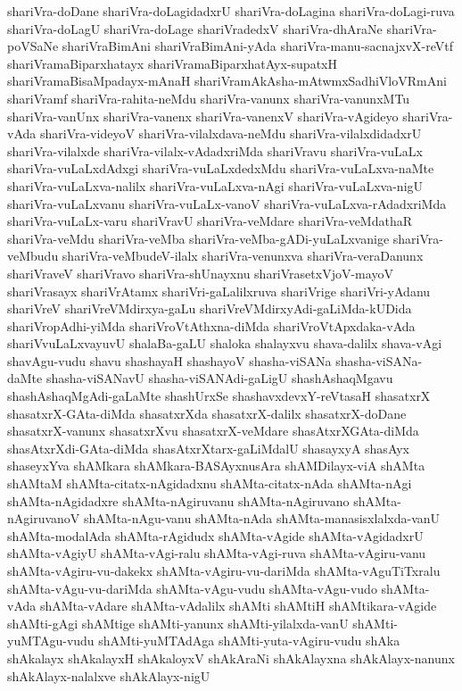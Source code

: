 {shariVra-doDane
shariVra-doLagidadxrU
shariVra-doLagina
shariVra-doLagi-ruva
shariVra-doLagU
shariVra-doLage
shariVradedxV
shariVra-dhAraNe
shariVra-poVSaNe
shariVraBimAni
shariVraBimAni-yAda
shariVra-manu-sacnajxvX-reVtf
shariVramaBiparxhatayx
shariVramaBiparxhatAyx-supatxH
shariVramaBisaMpadayx-mAnaH
shariVramAkAsha-mAtwmxSadhiVloVRmAni
shariVramf
shariVra-rahita-neMdu
shariVra-vanunx
shariVra-vanunxMTu
shariVra-vanUnx
shariVra-vanenx
shariVra-vanenxV
shariVra-vAgideyo
shariVra-vAda
shariVra-videyoV
shariVra-vilalxdava-neMdu
shariVra-vilalxdidadxrU
shariVra-vilalxde
shariVra-vilalx-vAdadxriMda
shariVravu
shariVra-vuLaLx
shariVra-vuLaLxdAdxgi
shariVra-vuLaLxdedxMdu
shariVra-vuLaLxva-naMte
shariVra-vuLaLxva-nalilx
shariVra-vuLaLxva-nAgi
shariVra-vuLaLxva-nigU
shariVra-vuLaLxvanu
shariVra-vuLaLx-vanoV
shariVra-vuLaLxva-rAdadxriMda
shariVra-vuLaLx-varu
shariVravU
shariVra-veMdare
shariVra-veMdathaR
shariVra-veMdu
shariVra-veMba
shariVra-veMba-gADi-yuLaLxvanige
shariVra-veMbudu
shariVra-veMbudeV-ilalx
shariVra-venunxva
shariVra-veraDanunx
shariVraveV
shariVravo
shariVra-shUnayxnu
shariVrasetxVjoV-mayoV
shariVrasayx
shariVrAtamx
shariVri-gaLalilxruva
shariVrige
shariVri-yAdanu
shariVreV
shariVreVMdirxya-gaLu
shariVreVMdirxyAdi-gaLiMda-kUDida
shariVropAdhi-yiMda
shariVroVtAthxna-diMda
shariVroVtApxdaka-vAda
shariVvuLaLxvayuvU
shalaBa-gaLU
shaloka
shalayxvu
shava-dalilx
shava-vAgi
shavAgu-vudu
shavu
shashayaH
shashayoV
shasha-viSANa
shasha-viSANa-daMte
shasha-viSANavU
shasha-viSANAdi-gaLigU
shashAshaqMgavu
shashAshaqMgAdi-gaLaMte
shashUrxSe
shashavxdevxY-reVtasaH
shasatxrX
shasatxrX-GAta-diMda
shasatxrXda
shasatxrX-dalilx
shasatxrX-doDane
shasatxrX-vanunx
shasatxrXvu
shasatxrX-veMdare
shasAtxrXGAta-diMda
shasAtxrXdi-GAta-diMda
shasAtxrXtarx-gaLiMdalU
shasayxyA
shasAyx
shaseyxYva
shAMkara
shAMkara-BASAyxnusAra
shAMDilayx-viA
shAMta
shAMtaM
shAMta-citatx-nAgidadxnu
shAMta-citatx-nAda
shAMta-nAgi
shAMta-nAgidadxre
shAMta-nAgiruvanu
shAMta-nAgiruvano
shAMta-nAgiruvanoV
shAMta-nAgu-vanu
shAMta-nAda
shAMta-manasisxlalxda-vanU
shAMta-modalAda
shAMta-rAgidudx
shAMta-vAgide
shAMta-vAgidadxrU
shAMta-vAgiyU
shAMta-vAgi-ralu
shAMta-vAgi-ruva
shAMta-vAgiru-vanu
shAMta-vAgiru-vu-dakekx
shAMta-vAgiru-vu-dariMda
shAMta-vAguTiTxralu
shAMta-vAgu-vu-dariMda
shAMta-vAgu-vudu
shAMta-vAgu-vudo
shAMta-vAda
shAMta-vAdare
shAMta-vAdalilx
shAMti
shAMtiH
shAMtikara-vAgide
shAMti-gAgi
shAMtige
shAMti-yanunx
shAMti-yilalxda-vanU
shAMti-yuMTAgu-vudu
shAMti-yuMTAdAga
shAMti-yuta-vAgiru-vudu
shAka
shAkalayx
shAkalayxH
shAkaloyxV
shAkAraNi
shAkAlayxna
shAkAlayx-nanunx
shAkAlayx-nalalxve
shAkAlayx-nigU
}
